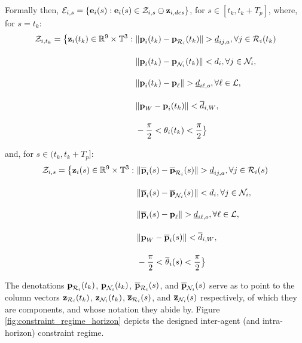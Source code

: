 Formally then, $\mathcal{E}_{i,s} = \{ \bm{\mathbf{e}}_i(s): \bm{\mathbf{e}}_i(s) \in \mathcal{Z}_{i,s} \ominus \bm{\mathbf{z}}_{i,des}\}$,
for $s \in [t_k, t_k + T_p]$, where, for $s = t_k$:
\begin{align}
  \mathcal{Z}_{i,t_k} = \big\{\bm{\mathbf{z}}_i(t_k) \in \mathbb{R}^{9}\times \mathbb{T}^3 : \
      & \|\bm{\mathbf{p}}_i(t_k) - \bm{\mathbf{p}}_{\mathcal{R}_i}(t_k)\| > \underline{d}_{ij,a}, \forall j \in \mathcal{R}_i(t_k)\\[2.5ex]
      & \|\bm{\mathbf{p}}_i(t_k) - \bm{\mathbf{p}}_{\mathcal{N}_i}(t_k)\| < d_i, \forall j \in \mathcal{N}_i, \\[2.5ex]
      & \|\bm{\mathbf{p}}_i(t_k) - \bm{\mathbf{p}}_{\ell}\| > \underline{d}_{i\ell,o}, \forall \ell \in \mathcal{L}, \\[2.5ex]
      & \|\bm{\mathbf{p}}_W - \bm{\mathbf{p}}_i(t_k)\| < \overline{d}_{i,W}, \\[2.5ex]
      & - \frac{\pi}{2} < \theta_i(t_k) < \frac{\pi}{2} \big\}
\end{align}

and, for $s \in (t_k, t_k + T_p]$:
\begin{align}
  \mathcal{Z}_{i,s} = \big\{\bm{\mathbf{z}}_i(s) \in \mathbb{R}^{9}\times \mathbb{T}^3 : \
      & \|\overline{\bm{\mathbf{p}}}_i(s) - \overline{\bm{\mathbf{p}}}_{\mathcal{R}_i}(s)\| > \underline{d}_{ij,a}, \forall j \in \mathcal{R}_i(s)\\[2.5ex]
      & \|\overline{\bm{\mathbf{p}}}_i(s) - \overline{\bm{\mathbf{p}}}_{\mathcal{N}_i}(s)\| < d_i, \forall j \in \mathcal{N}_i, \\[2.5ex]
      & \|\overline{\bm{\mathbf{p}}}_i(s) - \bm{\mathbf{p}}_{\ell}\| > \underline{d}_{i\ell,o}, \forall \ell \in \mathcal{L}, \\[2.5ex]
      & \|\bm{\mathbf{p}}_W - \overline{\bm{\mathbf{p}}}_i(s)\| < \overline{d}_{i,W}, \\[2.5ex]
      & - \frac{\pi}{2} < \overline{\theta}_i(s) < \frac{\pi}{2} \big\}
\end{align}

The denotations $\bm{\mathbf{p}}_{\mathcal{R}_i}(t_k)$, $\bm{\mathbf{p}}_{\mathcal{N}_i}(t_k)$,
$\overline{\bm{\mathbf{p}}}_{\mathcal{R}_i}(s)$, and $\overline{\bm{\mathbf{p}}}_{\mathcal{N}_i}(s)$
serve as to point to the column vectors $\bm{\mathbf{z}}_{\mathcal{R}_i}(t_k)$,
$\bm{\mathbf{z}}_{\mathcal{N}_i}(t_k)$, $\overline{\bm{\mathbf{z}}}_{\mathcal{R}_i}(s)$, and
$\overline{\bm{\mathbf{z}}}_{\mathcal{N}_i}(s)$ respectively, of which they are
components, and whose notation they abide by.
Figure \eqref{fig:constraint_regime_horizon} depicts the designed inter-agent
(and intra-horizon) constraint regime.\\[2.5ex]


